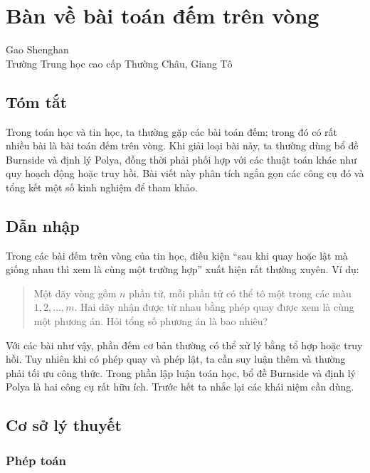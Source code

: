 \documentclass[11pt]{article}
\begin{document}
\section{Bàn về bài toán đếm trên vòng}

\begin{center}
Gao Shenghan\\
Trường Trung học cao cấp Thường Châu, Giang Tô
\end{center}

\subsection{Tóm tắt}

Trong toán học và tin học, ta thường gặp các bài toán đếm; trong đó có rất
nhiều bài là bài toán đếm trên vòng. Khi giải loại bài này, ta thường dùng bổ
đề Burnside và định lý Polya, đồng thời phải phối hợp với các thuật toán khác
như quy hoạch động hoặc truy hồi. Bài viết này phân tích ngắn gọn các công cụ
đó và tổng kết một số kinh nghiệm để tham khảo.

\subsection{Dẫn nhập}

Trong các bài đếm trên vòng của tin học, điều kiện ``sau khi quay hoặc lật mà
giống nhau thì xem là cùng một trường hợp'' xuất hiện rất thường xuyên. Ví dụ:

\begin{quote}
Một dãy vòng gồm \(n\) phần tử, mỗi phần tử có thể tô một trong các màu
\(1,2,\ldots,m\). Hai dãy nhận được từ nhau bằng phép quay được xem là cùng
một phương án. Hỏi tổng số phương án là bao nhiêu?
\end{quote}

Với các bài như vậy, phần đếm cơ bản thường có thể xử lý bằng tổ hợp hoặc truy
hồi. Tuy nhiên khi có phép quay và phép lật, ta cần suy luận thêm và thường
phải tối ưu công thức. Trong phần lập luận toán học, bổ đề Burnside và định lý
Polya là hai công cụ rất hữu ích. Trước hết ta nhắc lại các khái niệm cần dùng.

\subsection{Cơ sở lý thuyết}

\subsubsection{Phép toán}
\end{document}
